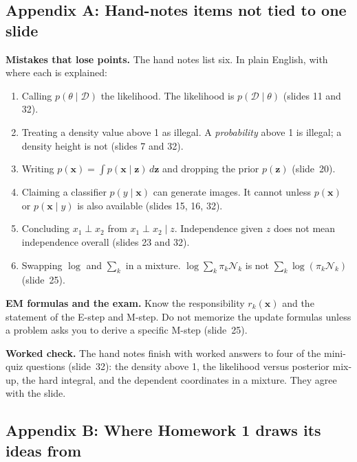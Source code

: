 \appendix
\subsection*{Appendix A: Hand-notes items not tied to one slide}

\textbf{Mistakes that lose points.} The hand notes list six. In plain English, with where each is explained:
\begin{enumerate}
\item Calling $p(\theta\mid\mathcal{D})$ the likelihood. The likelihood is $p(\mathcal{D}\mid\theta)$ (slides 11 and 32).
\item Treating a density value above 1 as illegal. A \textit{probability} above 1 is illegal; a density height is not (slides 7 and 32).
\item Writing $p(\mathbf{x})=\int p(\mathbf{x}\mid\mathbf{z})\,d\mathbf{z}$ and dropping the prior $p(\mathbf{z})$ (slide~20).
\item Claiming a classifier $p(y\mid\mathbf{x})$ can generate images. It cannot unless $p(\mathbf{x})$ or $p(\mathbf{x}\mid y)$ is also available (slides 15, 16, 32).
\item Concluding $x_1\perp x_2$ from $x_1\perp x_2\mid z$. Independence given $z$ does not mean independence overall (slides 23 and 32).
\item Swapping $\log$ and $\sum_k$ in a mixture. $\log\sum_k\pi_k\mathcal{N}_k$ is not $\sum_k\log(\pi_k\mathcal{N}_k)$ (slide~25).
\end{enumerate}

\textbf{EM formulas and the exam.} Know the responsibility $r_k(\mathbf{x})$ and the statement of the E-step and M-step. Do not memorize the update formulas unless a problem asks you to derive a specific M-step (slide~25).

\textbf{Worked check.} The hand notes finish with worked answers to four of the mini-quiz questions (slide~32): the density above 1, the likelihood versus posterior mix-up, the hard integral, and the dependent coordinates in a mixture. They agree with the slide.

\subsection*{Appendix B: Where Homework 1 draws its ideas from}

